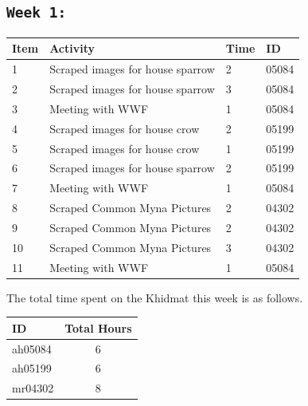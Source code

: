 \documentclass{article}
\begin{document}
\subsection{\texttt{Week 1: }}
\begin{center}
\begin{tabular}{|l|l|l|l|}
  \hline
  \textbf{Item} 	& \textbf{Activity} & \textbf{Time} & \textbf{ID} \\\hline
  1 & Scraped images for house sparrow & 2 & 05084 \\ \hline
  2 & Scraped images for house sparrow & 3 & 05084\\ \hline
  3 & Meeting with WWF & 1 & 05084\\ \hline
  4 & Scraped images for house crow & 2 & 05199\\ \hline
  5 & Scraped images for house crow & 1 & 05199\\ \hline
  6 & Scraped images for house sparrow & 2 & 05199\\ \hline
  7 & Meeting with WWF & 1 & 05084\\ \hline
  8 & Scraped Common Myna Pictures & 2 & 04302\\ \hline
  9 & Scraped Common Myna Pictures & 2 & 04302\\ \hline
  10 & Scraped Common Myna Pictures & 3 & 04302\\ \hline
  11 & Meeting with WWF & 1 & 05084 \\ \hline
\end{tabular}
    
\end{center}
The total time spent on the Khidmat this week is as follows.    
\begin{center}
    
\begin{tabular}{|l|c|}
  \hline
  \textbf{ID} & \textbf{Total Hours}\\\hline
  ah05084 & 6 \\\hline
  ah05199 & 6 \\\hline
  mr04302 & 8 \\\hline
\end{tabular}
\end{center}
\newpage
\end{document}
